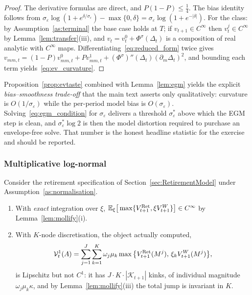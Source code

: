 \begin{proof}
The derivative formulas are direct, and $P(1-P)\le\tfrac14$. The bias identity follows
from $\sigma_\varepsilon\log(1+e^{\delta/\sigma_\varepsilon})-\max\{0,\delta\}
=\sigma_\varepsilon\log(1+e^{-|\delta|})$. For the class: by
Assumption~\ref{as:terminal} the base case holds at $T$; if $v_{t+1}\in C^{\infty}$
then $v_t^{j}\in C^{\infty}$ by Lemma~\ref{lem:transfer}(iii), and
$v_t=v_t^{0}+\Phi^{\sigma}(\Delta_t)$ is a composition of real analytic with
$C^{\infty}$ maps. Differentiating~\eqref{eq:reduced_form} twice gives
$v_{mm,t}=(1-P)v_{mm,t}^{0}+Pv_{mm,t}^{1}+(\Phi^{\sigma})''(\Delta_t)(\partial_m\Delta_t)^{2}$,
and bounding each term yields~\eqref{eq:ev_curvature}.
\end{proof}

Proposition~\ref{prop:evtaste} combined with Lemma~\ref{lem:egm} yields the explicit
\emph{bias--smoothness trade-off} that the main text asserts only qualitatively:
curvature is $O(1/\sigma_\varepsilon)$ while the per-period model bias is
$O(\sigma_\varepsilon)$. Solving~\eqref{eq:egm_condition} for $\sigma_\varepsilon$
delivers a threshold $\sigma_\varepsilon^{\ast}$ above which the EGM step is clean, and
$\sigma_\varepsilon^{\ast}\log 2$ is then the model distortion required to purchase an
envelope-free solve. That number is the honest headline statistic for the exercise and
should be reported.

\subsubsection{Multiplicative log-normal}

\begin{proposition}
\label{prop:lognormaltaste}
Consider the retirement specification of Section~\ref{sec:RetirementModel} under
Assumption~\ref{as:normalisation}.
\begin{enumerate}
    \item With \emph{exact} integration over $\xi$,
    $\mathbb{E}_\xi\big[\max\{V_{t+1}^{\mathrm{Ret}},\xi V_{t+1}^{W}\}\big]\in C^{\infty}$ by
    Lemma~\ref{lem:mollify}(i).
    \item With $K$-node discretisation, the object actually computed,
    \begin{align}
    \mathcal{V}_t^{1}(A)=\sum_{j=1}^{J}\sum_{k=1}^{K}\omega_j\mu_k
    \max\big\{V_{t+1}^{\mathrm{Ret}}(M^{j}),\,\xi_k V_{t+1}^{W}(M^{j})\big\},
    \end{align}
    is Lipschitz but not $C^{1}$: it has $J\!\cdot\!K\!\cdot\!|\mathcal{K}_{t+1}|$ kinks,
    of individual magnitude $\omega_j\mu_k\kappa$, and by
    Lemma~\ref{lem:mollify}(iii) the total jump is invariant in $K$.
\end{enumerate}
\end{proposition}


